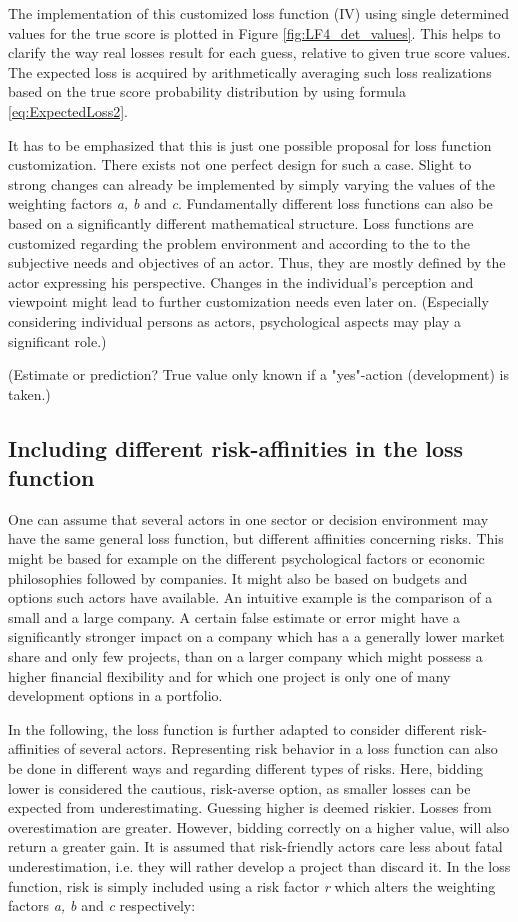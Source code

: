 	The implementation of this customized loss function (IV) using single determined values for the true score is plotted in Figure \ref{fig:LF4_det_values}. This helps to clarify the way real losses result for each guess, relative to given true score values. The expected loss is acquired by arithmetically averaging such loss realizations based on the true score probability distribution by using formula \ref{eq:ExpectedLoss2}.
	
	It has to be emphasized that this is just one possible proposal for loss function customization. There exists not one perfect design for such a case. Slight to strong changes can already be implemented by simply varying the values of the weighting factors \textit{a, b} and \textit{c}. Fundamentally different loss functions can also be based on a significantly different mathematical structure. Loss functions are customized regarding the problem environment and according to the to the subjective needs and objectives of an actor. Thus, they are mostly defined by the actor expressing his perspective. Changes in the individual's perception and viewpoint might lead to further customization needs even later on. (Especially considering individual persons as actors, psychological aspects may play a significant role.)
	
	(Estimate or prediction? True value only known if a "yes"-action (development) is taken.)
	
	\subsection{Including different risk-affinities in the loss function}
	
	One can assume that several actors in one sector or decision environment may have the same general loss function, but different affinities concerning risks. This might be based for example on the different psychological factors or economic philosophies followed by companies. It might also be based on budgets and options such actors have available. An intuitive example is the comparison of a small and a large company. A certain false estimate or error might have a significantly stronger impact on a company which has a a generally lower market share and only few projects, than on a larger company which might possess a higher financial flexibility and for which one project is only one of many development options in a portfolio.
	
	In the following, the loss function is further adapted to consider different risk-affinities of several actors. Representing risk behavior in a loss function can also be done in different ways and regarding different types of risks. Here, bidding lower is considered the cautious, risk-averse option, as smaller losses can be expected from underestimating. Guessing higher is deemed riskier. Losses from overestimation are greater. However, bidding correctly on a higher value, will also return a greater gain. It is assumed that risk-friendly actors care less about fatal underestimation, i.e. they will rather develop a project than discard it. In the loss function, risk is simply included using a risk factor \textit{r} which alters the weighting factors \textit{a, b} and \textit{c} respectively:
	
